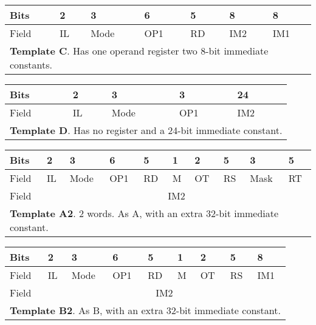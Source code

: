 \documentclass[forwardcom.tex]{subfiles}
\begin{document}
\begin{table}[h!] \label{table:templateC}
\vv
\begin{tabular}{|p{10mm}|p{10mm}|p{10mm}|p{10mm}|p{10mm}|p{38.5mm}|p{24mm}|} \hline
 Bits & 2 & 3 & 6 & 5 & \hspace{15mm} 8 & \hspace{8mm} 8 \\ \hline
Field & IL & Mode & OP1 & RD & \hspace{14mm} IM2 & \hspace{7mm} IM1 \\ \hline
\multicolumn{7}{|l|}{
\textbf{Template C}. Has one operand register two 8-bit immediate constants.} \\ \hline
\end{tabular}
\end{table}
\vv

\begin{table}[h!] \label{table:templateD}
\vv
\begin{tabular}{|p{10mm}|p{10mm}|p{10mm}|p{10mm}|p{81.5mm}|} \hline
 Bits & 2 & 3 & 3 & \hspace{33mm} 24 \\ \hline
Field & IL & Mode & OP1 & \hspace{32mm} IM2 \\ \hline
\multicolumn{5}{|l|}{
\textbf{Template D}. Has no register and a 24-bit immediate constant.
} \\ \hline
\end{tabular}
\end{table}
\vv

\begin{table}[h!] \label{table:templateA2}
\vv
\begin{tabular}{|p{10mm}|p{10mm}|p{10mm}|p{10mm}|p{10mm}|p{10mm}|p{10mm}|p{10mm}|p{10mm}|p{10mm}|} \hline
 Bits & 2 & 3 & 6 & 5 & 1 & 2 & 5 & 3 & 5 \\ \hline
Field & IL & Mode & OP1 & RD & M & OT & RS & Mask & RT  \\ \hline
Field & \multicolumn{9}{|c|}{ IM2 } \\ \hline
\multicolumn{10}{|l|}{
\textbf{Template A2}. 2 words. As A, with an extra 32-bit immediate constant.
} \\ \hline
\end{tabular}
\end{table}
\vv

\begin{table}[h!] \label{table:templateB2}
\vv
\begin{tabular}{|p{10mm}|p{10mm}|p{10mm}|p{10mm}|p{10mm}|p{10mm}|p{10mm}|p{10mm}|p{24mm}|} \hline
 Bits & 2 & 3 & 6 & 5 & 1 & 2 & 5 & 8 \\ \hline
Field & IL & Mode & OP1 & RD & M & OT & RS & IM1 \\ \hline
Field & \multicolumn{8}{|c|}{ IM2 } \\ \hline
\multicolumn{9}{|l|}{
\textbf{Template B2}. As B, with an extra 32-bit immediate constant.} \\ \hline
\end{tabular}
\end{table}
\vv
\end{document}
